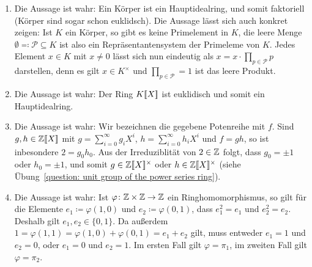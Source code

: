 \begin{solution}
  \begin{enumerate}
    \item
      Die Aussage ist wahr:
      Ein Körper ist ein Hauptidealring, und somit faktoriell (Körper sind sogar schon euklidsch).
      Die Aussage lässt sich auch konkret zeigen:
      Ist $K$ ein Körper, so gibt es keine Primelement in $K$, die leere Menge $\emptyset \eqqcolon \mathcal{P} \subseteq K$ ist also ein Repräsentantensystem der Primeleme von $K$.
      Jedes Element $x \in K$ mit $x \neq 0$ lässt sich nun eindeutig als $x = x \cdot \prod_{p \in \mathcal{P}} p$ darstellen, denn es gilt $x \in K^\times$ und $\prod_{p \in \mathcal{P}} = 1$ ist das leere Produkt.
    \item
      Die Aussage ist wahr:
      Der Ring $K[\![X]\!]$ ist euklidisch und somit ein Hauptidealring.
    \item
      Die Aussage ist wahr:
      Wir bezeichnen die gegebene Potenreihe mit $f$.
      Sind $g, h \in \mathbb{Z}[\![X]\!]$ mit $g = \sum_{i=0}^\infty g_i X^i$, $h = \sum_{i=0}^\infty h_i X^i$ und $f = gh$, so ist inbesondere $2 = g_0 h_0$.
      Aus der Irreduziblität von $2 \in \mathbb{Z}$ folgt, dass $g_0 = \pm 1$ oder $h_0 = \pm 1$, und somit $g \in \mathbb{Z}[\![X]\!]^\times$ oder $h \in \mathbb{Z}[\![X]\!]^\times$ (siehe Übung~\ref{question: unit group of the power series ring}).
    \item
      Die Aussage ist wahr:
      Ist $\varphi \colon \mathbb{Z} \times \mathbb{Z} \to \mathbb{Z}$ ein Ringhomomorphismus, so gilt für die Elemente $e_1 \coloneqq \varphi(1,0)$ und $e_2 \coloneqq \varphi(0,1)$, dass $e_1^2 = e_1$ und $e_2^2 = e_2$.
      Deshalb gilt $e_1, e_2 \in \{0,1\}$.
      Da außerdem $1 = \varphi(1,1) = \varphi(1,0) + \varphi(0,1) = e_1 + e_2$ gilt, muss entweder $e_1 = 1$ und $e_2 = 0$, oder $e_1 = 0$ und $e_2 = 1$.
      Im ersten Fall gilt $\varphi = \pi_1$, im zweiten Fall gilt $\varphi = \pi_2$.
      

\end{enumerate}
\end{solution}
